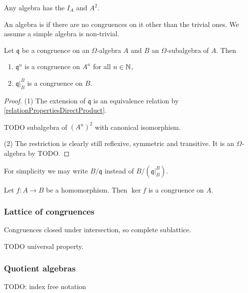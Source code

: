 \begin{example}
Any algebra has the  $I_A$ and $A^2$.
\end{example}

An algebra is  if there are no congruences on it other than the trivial ones. We assume a simple algebra is non-trivial.

\begin{lemma} \label{basicCongruenceLemma}
Let $\mathfrak{q}$ be a congruence on an $\Omega$-algebra $A$ and $B$ an $\Omega$-subalgebra of $A$. Then
\begin{enumerate}
\item $\mathfrak{q}^n$ is a congruence on $A^n$ for all $n\in \mathbb{N}$,
\item $\mathfrak{q}|_B^B$ is a congruence on $B$.
\end{enumerate}
\end{lemma}
\begin{proof}
(1) The extension of $\mathfrak{q}$ is an equivalence relation by \ref{relationPropertiesDirectProduct}.

TODO subalgebra of $(A^n)^2$ with canonical isomorphism.

(2) The restriction is clearly still reflexive, symmetric and transitive. It is an $\Omega$-algebra by TODO.
\end{proof}
For simplicity we may write $B/\mathfrak{q}$ instead of $B/(\mathfrak{q}|_B^B)$.

\begin{proposition} \label{kernelCongruence}
Let $f:A\to B$ be a homomorphism. Then $\ker f$ is a congruence on $A$.
\end{proposition}

\subsubsection{Lattice of congruences}

Congruences closed under intersection, so complete sublattice.

TODO universal property.

\subsubsection{Quotient algebras}
TODO: index free notation

